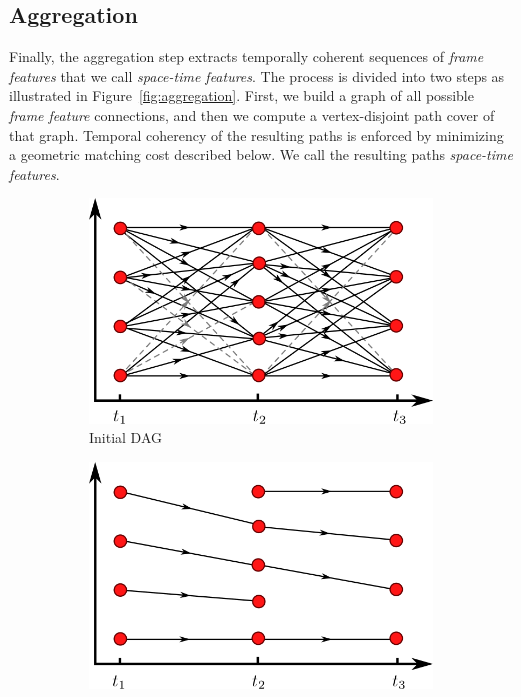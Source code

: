 \subsection{Aggregation}\label{sec:features:aggregation}
Finally, the aggregation step extracts temporally coherent sequences of \emph{frame features} that we call \emph{space-time features}. 
The process is divided into two steps as illustrated in Figure~\ref{fig:aggregation}.
First, we build a graph of all possible \emph{frame feature} connections, and then we compute a vertex-disjoint path cover of that graph. Temporal coherency of the resulting paths is enforced by minimizing a geometric matching cost described below. We call the resulting paths \emph{space-time features}.
\begin{figure}[!h]
	\centering
	\begin{subfigure}[b]{0.48\linewidth}
		\centering
		\includegraphics[width=\textwidth]{images/fluidsculpting-mig2016/dag_features.png}
		\caption{\label{fig:dagFeatures}Initial DAG}
	\end{subfigure}
	\hspace{0.1cm}
	\begin{subfigure}[b]{0.48\linewidth}
		\centering
		\includegraphics[width=\textwidth]{images/fluidsculpting-mig2016/aggregation_step2.png}

\end{subfigure}
\end{figure}
